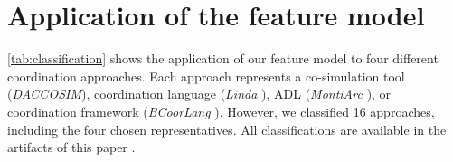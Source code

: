 \documentclass[runningheads]{llncs}
\begin{document}
\section{Application of the feature model} \label{sec:application}
\autoref{tab:classification} shows the application of our feature model to four different coordination approaches.
Each approach represents a co-simulation tool (\textit{DACCOSIM}), coordination language (\textit{Linda} \cite{carrieroLindaContext1989,carrieroLindaAlternativeMessagepassing1994}), ADL (\textit{MontiArc} \cite{haberMontiArcArchitecturalModeling2014}), or coordination framework (\textit{BCoorLang} \cite{krauterBehavioralConsistencyHeterogeneous2021,krauterBehavioralConsistencyMultimodeling2023}).
However, we classified 16 approaches, including the four chosen representatives.
All classifications are available in the artifacts of this paper \cite{timkrauterArtifactsCoordination2024}.
\end{document}
